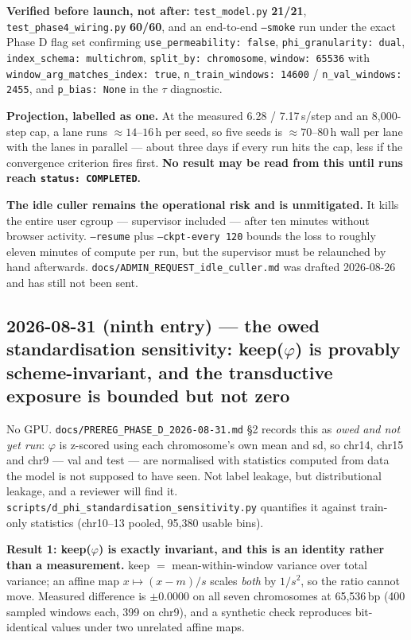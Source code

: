 \documentclass[11pt,a4paper]{article}
\newcommand{\code}[1]{\texttt{\small #1}}
\begin{document}
\textbf{Verified before launch, not after:} \code{test\_model.py}
\textbf{21/21}, \code{test\_phase4\_wiring.py} \textbf{60/60}, and an end-to-end
\code{--smoke} run under the exact Phase D flag set confirming
\code{use\_permeability: false}, \code{phi\_granularity: dual},
\code{index\_schema: multichrom}, \code{split\_by: chromosome},
\code{window: 65536} with \code{window\_arg\_matches\_index: true},
\code{n\_train\_windows: 14600} / \code{n\_val\_windows: 2455}, and
\code{p\_bias: None} in the $\tau$ diagnostic.

\textbf{Projection, labelled as one.} At the measured 6.28 / 7.17\,s/step and an
8{,}000-step cap, a lane runs $\approx 14$--$16$\,h per seed, so five seeds is
$\approx 70$--$80$\,h wall per lane with the lanes in parallel --- about three
days if every run hits the cap, less if the convergence criterion fires first.
\textbf{No result may be read from this until runs reach
\code{status: COMPLETED}.}

\textbf{The idle culler remains the operational risk and is unmitigated.} It
kills the entire user cgroup --- supervisor included --- after ten minutes
without browser activity. \code{--resume} plus \code{--ckpt-every 120} bounds
the loss to roughly eleven minutes of compute per run, but the supervisor must
be relaunched by hand afterwards. \code{docs/ADMIN\_REQUEST\_idle\_culler.md}
was drafted 2026-08-26 and has still not been sent.


\subsection*{2026-08-31 (ninth entry) --- the owed standardisation sensitivity:
keep($\varphi$) is provably scheme-invariant, and the transductive exposure is
bounded but not zero}

No GPU. \code{docs/PREREG\_PHASE\_D\_2026-08-31.md} \S2 records this as
\emph{owed and not yet run}: $\varphi$ is z-scored using each chromosome's own
mean and sd, so chr14, chr15 and chr9 --- val and test --- are normalised with
statistics computed from data the model is not supposed to have seen. Not label
leakage, but distributional leakage, and a reviewer will find it.
\code{scripts/d\_phi\_standardisation\_sensitivity.py} quantifies it against
train-only statistics (chr10--13 pooled, 95{,}380 usable bins).

\textbf{Result 1: keep($\varphi$) is exactly invariant, and this is an identity
rather than a measurement.} keep $=$ mean-within-window variance over total
variance; an affine map $x \mapsto (x-m)/s$ scales \emph{both} by $1/s^2$, so the
ratio cannot move. Measured difference is $\pm 0.0000$ on all seven chromosomes
at 65{,}536\,bp (400 sampled windows each, 399 on chr9), and a synthetic check
reproduces bit-identical values under two unrelated affine maps.
\end{document}
